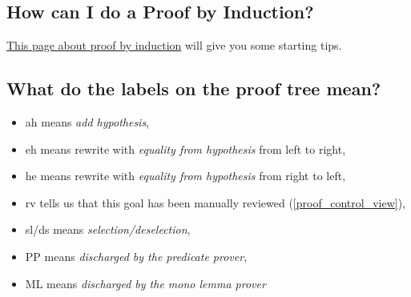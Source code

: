 \subsection{How can I do a Proof by Induction?}
\href{http://wiki.event-b.org/index.php/Induction_proof}{This page about proof by induction} will give you some starting tips.

\subsection{What do the labels on the proof tree mean?}

\begin{itemize}
	\item \textsf{ah} means \textit{add hypothesis},
	\item \textsf{eh} means rewrite with \textit{equality from hypothesis} from left to right,
	\item \textsf{he} means rewrite with \textit{equality from hypothesis} from right to left,
	\item \textsf{rv} tells us that this goal has been manually reviewed (\ref{proof_control_view}),
	\item \textsf{sl/ds} means \textit{selection/deselection},
	\item \textsf{PP} means \textit{discharged by the predicate prover},
	\item \textsf{ML} means \textit{discharged by the mono lemma prover}
\end{itemize}

